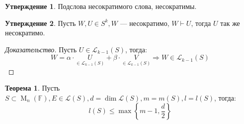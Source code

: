 \documentclass[a4paper, 14pt]{extarticle}
\theoremstyle{definition}
\newtheorem{theorem}{Теорема}
\newtheorem{state}{Утверждение}
\begin{document}
\begin{state}\label{st7_1}
	Подслова несократимого слова, несократимы.
\end{state}

\begin{state}\label{st7_2}
	Пусть \(W, U \in S^k, W\) --- несократимо, \(W \vdash U\), тогда \(U\) так же несократимо.
\end{state}

\begin{proof}[Доказательство]
	Пусть \(U \in \mathcal{L}_{k - 1}(S)\), тогда: \[W = \alpha \cdot \underset{\in \mathcal{L}_{k - 1}(S)}{U} + \beta \cdot \underset{\in \mathcal{L}_{k - 1}(S)}{V} \Rightarrow W \in \mathcal{L}_{k - 1}(S)\]
\end{proof}

\begin{theorem}
	Пусть \(S \subset \operatorname{M}_n(\mathbb{F}), E \in \mathcal{L}(S), d = \operatorname{dim} \mathcal{L}(S), m = m(S), l = l(S)\), тогда:
	\[l(S) \leqslant \operatorname{max} \left\{m - 1, \frac{d}{2}\right\}\]
\end{theorem}
\end{document}
